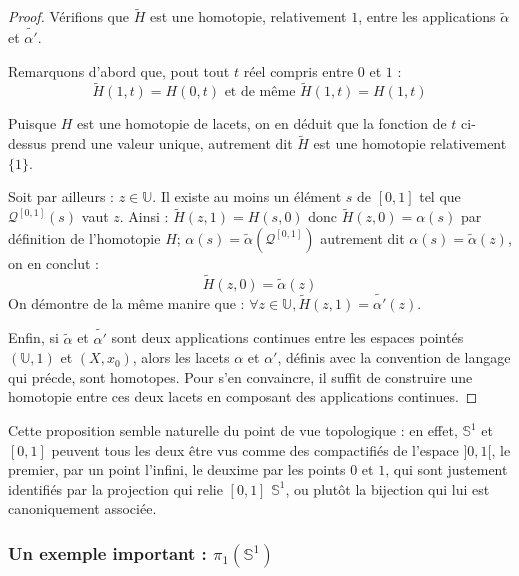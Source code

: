 \begin{proof}
\par
V\'erifions que $\tilde{H}$ est une homotopie, relativement  $1$, entre les applications $\tilde{\alpha}$ et $\tilde{\alpha '}$.

\par
Remarquons d'abord que, pout tout $t$ r\'eel compris entre $0$ et $1$ :
\[\tilde{H}(1,t)=H(0,t)\text{ et de m\^eme }\tilde{H}(1,t)=H(1,t)\]

Puisque $H$ est une homotopie de lacets, on en d\'eduit que la fonction de $t$ ci-dessus prend une valeur unique, %
autrement dit $\tilde{H}$ est une homotopie relativement  $\{1\}$.

\par
Soit par ailleurs : $z\in\mathbb{U}$. Il existe au moins un \'el\'ement $s$ de $[0,1]$ tel que $\mathcal{Q}^{[0,1]}(s)$ vaut $z$. %
Ainsi : $\tilde{H}(z,1)=H(s,0)$ donc $\tilde{H}(z,0)=\alpha (s)$ par d\'efinition de l'homotopie $H$; %
$\alpha (s)=\tilde{\alpha}\left(\mathcal{Q}^{[0,1]}\right)$ autrement dit $\alpha (s)=\tilde{\alpha}(z)$, on en conclut :
\[\tilde{H}(z,0)=\tilde{\alpha}(z)\]
On d\'emontre de la m\^eme manire que : $\forall z \in\mathbb{U},\tilde{H}(z,1)=\tilde{\alpha '}(z)$.

\par
Enfin, si $\tilde{\alpha}$ et $\tilde{\alpha '}$ sont deux applications continues entre les espaces point\'es $(\mathbb{U},1)$ et $(X,x_0)$, %
alors les lacets $\alpha$ et $\alpha '$, d\'efinis avec la convention de langage qui pr\'ecde, sont homotopes. %
Pour s'en convaincre, il suffit de construire une homotopie entre ces deux lacets en composant des applications continues.
\end{proof}

\begin{rema}
Cette proposition semble naturelle du point de vue topologique : %
en effet, $\mathbb{S}^1$ et $[0,1]$ peuvent tous les deux \^etre vus comme des compactifi\'es de l'espace $]0,1[$, %
le premier, par un point  l'infini, le deuxime par les points $0$ et $1$, %
qui sont justement identifi\'es par la projection qui relie $[0,1]$  $\mathbb{S}^1$, %
ou plut\^ot la bijection qui lui est canoniquement associ\'ee.
\end{rema}

\subsubsection{Un exemple important : $\pi_1(\mathbb{S}^1)$}\label{gs1}

